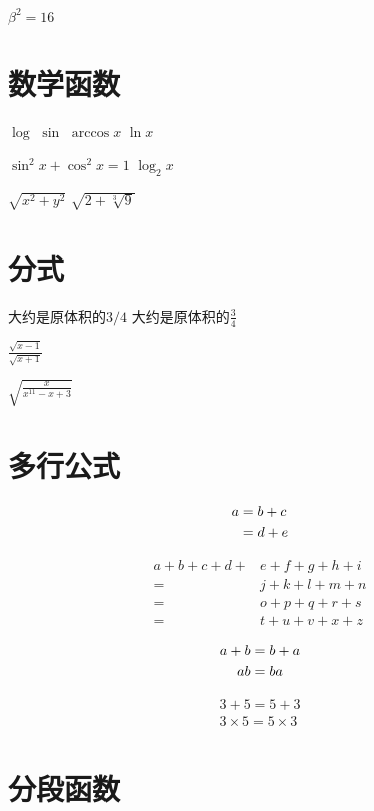 \documentclass{article}
\begin{document}
    $\beta^2 = 16$

    \section{数学函数}
    $\log$
    $\sin$
    $\arccos x$
    $\ln x$

    $\sin^2 x+\cos^2 x = 1$
    $\log_2 x$

    $\sqrt{x ^ 2 + y ^ 2}$
    $\sqrt{2 + \sqrt[3]{9}}$ %

    \section{分式}
    大约是原体积的$3/4$
    大约是原体积的$\frac{3}{4}$

    $\frac{\sqrt{x-1}}{\sqrt{x+1}}$

    $\sqrt{\frac{x}{x^{11} - x + 3}}$



    \section{多行公式}
    \begin{align} 
    a & = b + c \notag \\ 
    &=d+e 
    \end{align}
    
    \[
    \begin{aligned}  %
    a+b+c+d+& e+f+g+h+i \\
    =& j+k+l+m+n \\
    =& o+p+q+r+s \\ 
    =& t+u+v+x+z \end{aligned}
    \]

    \begin{gather}
    a+b=b+a \notag \\
    ab = ba    
    \end{gather}

    \begin{gather*}
    3+5=5+3 \\
    3 \times 5 = 5 \times 3
    \end{gather*}


    \section{分段函数}
    
\end{document}
